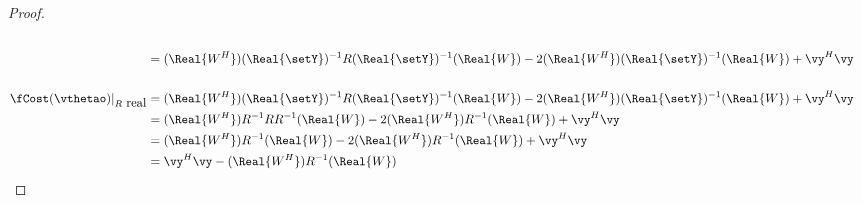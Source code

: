 \begin{proof}
\begin{align*}
   \\&=    (\Real{W^H})(\Real{\setY})^{-1} R (\Real{\setY})^{-1}(\Real{W})     - 2(\Real{W^H})(\Real{\setY})^{-1}(\Real{W})      + \vy^H\vy
\\
\\
   \fCost(\vthetao)|_{R\mbox{ real}}
     &=    (\Real{W^H})(\Real{\setY})^{-1} R (\Real{\setY})^{-1}(\Real{W}) - 2(\Real{W^H})(\Real{\setY})^{-1}(\Real{W}) + \vy^H\vy
   \\&=    (\Real{W^H})R^{-1} R R^{-1}(\Real{W}) - 2(\Real{W^H})R^{-1}(\Real{W}) + \vy^H\vy
   \\&=    (\Real{W^H}) R^{-1}(\Real{W}) - 2(\Real{W^H})R^{-1}(\Real{W}) + \vy^H\vy
   \\&=    \vy^H\vy - (\Real{W^H})R^{-1}(\Real{W})
\end{align*}
\end{proof}

